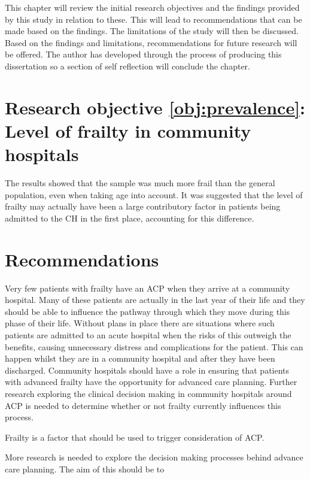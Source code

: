 \documentclass
[
	12pt,
	a4paper,
	oneside,
]{report}
\begin{document}
This chapter will review the initial research objectives and the findings
provided by this study in relation to these. 
This will lead to recommendations that can be made based on the findings. The
limitations of the study will then be discussed. Based on the findings and 
limitations, recommendations for future research will be offered. The author
has developed through the process of producing this dissertation so a section
of self reflection will conclude the chapter.

\section{Research objective \ref{obj:prevalence}: Level of frailty in
	community hospitals}

The results showed that the sample was much more frail than the general
population, even when taking age into account. It was suggested that the level
of frailty may actually have been a large contributory factor in patients
being admitted to the CH in the first place, accounting for this difference.



\section{Recommendations}
Very few patients with frailty have an ACP when they arrive at a community
hospital. Many of these patients are actually in the last year of their life
and they should be able to influence the pathway through which they move
during this phase of their life. Without plans in place there are situations
where such patients are admitted to an acute hospital when the risks of 
this outweigh the benefits, causing unnecessary distress and complications
for the patient. This can happen whilst they are in a community hospital
and after they have been discharged. Community hospitals should have a role 
in ensuring that patients with advanced frailty have the opportunity for
advanced care planning. 
Further research exploring the clinical decision making 
in community hospitals around ACP is needed to determine whether or not
frailty currently influences this process.

Frailty is a factor that should be used to trigger consideration of ACP.

More research is needed to explore the decision making processes behind
advance care planning. The aim of this should be to 

\printbibliography[heading=bibintoc]
\end{document}

